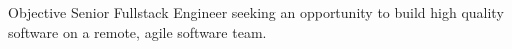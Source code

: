 \begin{section}{Objective}
  Senior Fullstack Engineer seeking an opportunity to build high quality software on a remote, agile software team.
\end{section}
